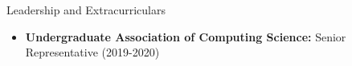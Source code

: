 \documentclass[]{mcdowellcv}
\begin{document}
\vspace*{-10pt}

\begin{cvsection}{Leadership and Extracurriculars}{}{}
  \begin{cvsubsection}
    {}{}{}
    \begin{itemize}
      \item \textbf{Undergraduate Association of Computing Science:} Senior Representative (2019-2020)  
    \end{itemize}
  \end{cvsubsection}
\end{cvsection}
\end{document}
